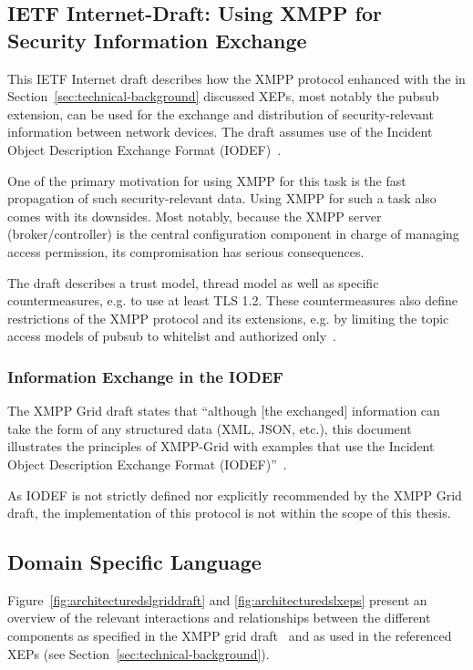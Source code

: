 \subsection{IETF Internet-Draft: Using XMPP for Security Information Exchange}\label{sec:ietf-internet-draft-using-xmpp-for-security-information-exchange}
This IETF Internet draft describes how the XMPP protocol enhanced with the in Section~\ref{sec:technical-background} discussed XEPs, most notably the \gls{pubsub} extension, can be used for the exchange and distribution of security-relevant information between network devices. The draft assumes use of the Incident Object Description Exchange Format (IODEF)~\cite{rfc7970}.

One of the primary motivation for using XMPP for this task is the fast propagation of such security-relevant data.
Using XMPP for such a task also comes with its downsides. Most notably, because the XMPP server (\gls{broker}/\gls{controller}) is the central configuration component in charge of managing access permission, its compromisation has serious consequences.

The draft describes a trust model, thread model as well as specific countermeasures, e.g. to use at least TLS 1.2. These countermeasures also define restrictions of the XMPP protocol and its extensions, e.g. by limiting the topic access models of \gls{pubsub} to whitelist and authorized only~\cite{ietf-mile-xmpp-grid-05}.

\subsubsection{Information Exchange in the IODEF}

The XMPP Grid draft states that ``although [the exchanged] information can take the form of any structured data (XML, JSON, etc.), this document illustrates the principles of XMPP-Grid with examples that use the Incident Object Description Exchange Format (IODEF)''~\cite{ietf-mile-xmpp-grid-05}.

As IODEF is not strictly defined nor explicitly recommended by the XMPP Grid draft, the implementation of this protocol is not within the scope of this thesis.

\subsection{Domain Specific Language}

Figure~\ref{fig:architecturedslgriddraft} and \ref{fig:architecturedslxeps} present an overview of the relevant interactions and relationships between the different components as specified in the XMPP grid draft~\cite{ietf-mile-xmpp-grid-05} and as used in the referenced XEPs (see Section~\ref{sec:technical-background}).

